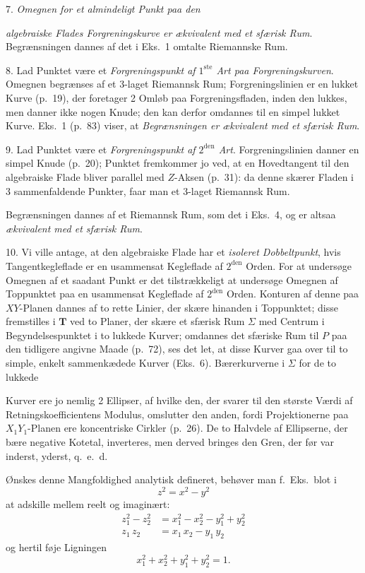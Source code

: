 \documentclass{article}
\begin{document}
7. \emph{Omegnen for et almindeligt Punkt paa den}

\emph{algebraiske Flades Forgreningskurve er ækvivalent med et sfærisk Rum}. Begrænsningen dannes af det i Eks.\ 1 omtalte Riemannske Rum.

8. Lad Punktet være et \emph{Forgreningspunkt af $1^{\text{ste}}$ Art paa Forgreningskurven}. Omegnen begrænses af et 3-laget Riemannsk Rum; Forgreningslinien er en lukket Kurve (p.\ 19), der foretager 2 Omløb paa Forgreningsfladen, inden den lukkes, men danner ikke nogen Knude; den kan derfor omdannes til en simpel lukket Kurve. Eks.\ 1 (p.\ 83) viser, at \emph{Begrænsningen er ækvivalent med et sfærisk Rum}.

9. Lad Punktet være et \emph{Forgreningspunkt af $2^{\text{den}}$ Art}. Forgreningslinien danner en simpel Knude (p.\ 20); Punktet fremkommer jo ved, at en Hovedtangent til den algebraiske Flade bliver parallel med $Z$-Aksen (p.\ 31): da denne skærer Fladen i 3 sammenfaldende Punkter, faar man et 3-laget Riemannsk Rum.

Begrænsningen dannes af et Riemannsk Rum, som det i Eks.\ 4, og er altsaa \emph{ækvivalent med et sfærisk Rum}.

10. Vi ville antage, at den algebraiske Flade har et \emph{isoleret Dobbeltpunkt}, hvis Tangentkegleflade er en usammensat Kegleflade af $2^{\text{den}}$ Orden. For at undersøge Omegnen af et saadant Punkt er det tilstrækkeligt at undersøge Omegnen af Toppunktet paa en usammensat Kegleflade af $2^{\text{den}}$ Orden. Konturen af denne paa $XY$-Planen dannes af to rette Linier, der skære hinanden i Toppunktet; disse fremstilles i $\mathbf{T}$ ved to Planer, der skære et sfærisk Rum $\Sigma$ med Centrum i Begyndelsespunktet i to lukkede Kurver; omdannes det sfæriske Rum til $P$ paa den tidligere angivne Maade (p.\ 72), ses det let, at disse Kurver gaa over til to simple, enkelt sammenkædede Kurver (Eks.\ 6). Bærerkurverne i $\Sigma$ for de to lukkede

Kurver ere jo nemlig 2 Ellipser, af hvilke den, der svarer til den største Værdi af Retningskoefficientens Modulus, omslutter den anden, fordi Projektionerne paa $X_1 Y_1$-Planen ere koncentriske Cirkler (p.\ 26). De to Halvdele af Ellipserne, der bære negative Kotetal, inverteres, men derved bringes den Gren, der før var inderst, yderst, q.\ e.\ d.

Ønskes denne Mangfoldighed analytisk defineret, behøver man f.\ Eks.\ blot i
\[
z^2 = x^2 - y^2
\]
at adskille mellem reelt og imaginært:
\[
\begin{aligned}
z_1^2 - z_2^2 &= x_1^2 - x_2^2 - y_1^2 + y_2^2 \\
z_1\,z_2 &= x_1\,x_2 - y_1\,y_2
\end{aligned}
\]
og hertil føje Ligningen
\[
x_1^2 + x_2^2 + y_1^2 + y_2^2 = 1.
\]
\end{document}

